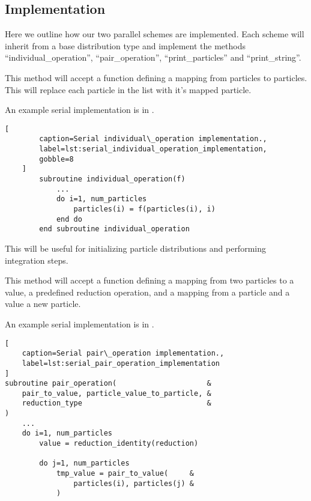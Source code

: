 \subsection{Implementation}

%
Here we outline how our two parallel schemes are implemented.
%
Each scheme will inherit from a base distribution type and
implement the methods
``individual\_operation'',
``pair\_operation'',
``print\_particles'' and
``print\_string''.
%
\begin{description}[style=nextline]
\item[individual\_operation]
    This method will accept a function defining a mapping from
    particles to particles.
    This will replace each particle in the list with it's mapped
    particle.

    An example serial implementation is in
    .

    \begin{lstlisting}[
        caption=Serial individual\_operation implementation.,
        label=lst:serial_individual_operation_implementation,
        gobble=8
    ]
        subroutine individual_operation(f)
            ...
            do i=1, num_particles
                particles(i) = f(particles(i), i)
            end do
        end subroutine individual_operation
    \end{lstlisting}
    
    This will be useful for initializing particle distributions
    and performing integration steps.

\item[pair\_operation]
    This method will accept a function defining a mapping from two
    particles to a value, a predefined reduction operation, and
    a mapping from a particle and a value a new particle.

    An example serial implementation is in
    .

\begin{lstlisting}[
    caption=Serial pair\_operation implementation.,
    label=lst:serial_pair_operation_implementation
]
subroutine pair_operation(                     &
    pair_to_value, particle_value_to_particle, &
    reduction_type                             &
)
    ...
    do i=1, num_particles
        value = reduction_identity(reduction)

        do j=1, num_particles
            tmp_value = pair_to_value(     &
                particles(i), particles(j) &
            )


\end{lstlisting}
\end{description}
